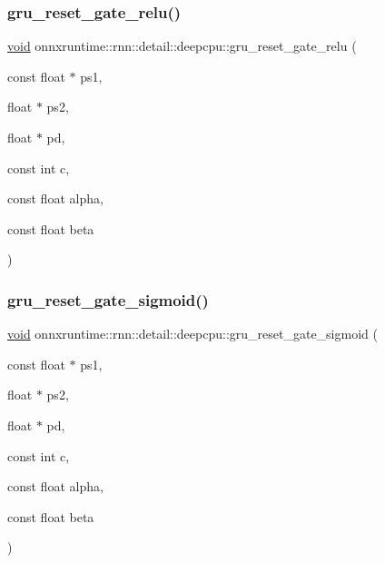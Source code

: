 \mbox{\label{namespaceonnxruntime_1_1rnn_1_1detail_1_1deepcpu_ad5420f147be377034238001dd54dcedb}} 
\subsubsection{\texorpdfstring{gru\+\_\+reset\+\_\+gate\+\_\+relu()}{gru\_reset\_gate\_relu()}}
{\footnotesize\ttfamily \mbox{\hyperlink{mlasi_8h_a88f941d423cb2a819b70a1358982b1a6}{void}} onnxruntime\+::rnn\+::detail\+::deepcpu\+::gru\+\_\+reset\+\_\+gate\+\_\+relu (\begin{DoxyParamCaption}\item[{const float $\ast$}]{ps1,  }\item[{float $\ast$}]{ps2,  }\item[{float $\ast$}]{pd,  }\item[{const int}]{c,  }\item[{const float}]{alpha,  }\item[{const float}]{beta }\end{DoxyParamCaption})}

\mbox{\label{namespaceonnxruntime_1_1rnn_1_1detail_1_1deepcpu_a1b4d38d57effefd3a8c1566e5f3495bc}} 
\subsubsection{\texorpdfstring{gru\+\_\+reset\+\_\+gate\+\_\+sigmoid()}{gru\_reset\_gate\_sigmoid()}}
{\footnotesize\ttfamily \mbox{\hyperlink{mlasi_8h_a88f941d423cb2a819b70a1358982b1a6}{void}} onnxruntime\+::rnn\+::detail\+::deepcpu\+::gru\+\_\+reset\+\_\+gate\+\_\+sigmoid (\begin{DoxyParamCaption}\item[{const float $\ast$}]{ps1,  }\item[{float $\ast$}]{ps2,  }\item[{float $\ast$}]{pd,  }\item[{const int}]{c,  }\item[{const float}]{alpha,  }\item[{const float}]{beta }\end{DoxyParamCaption})}

